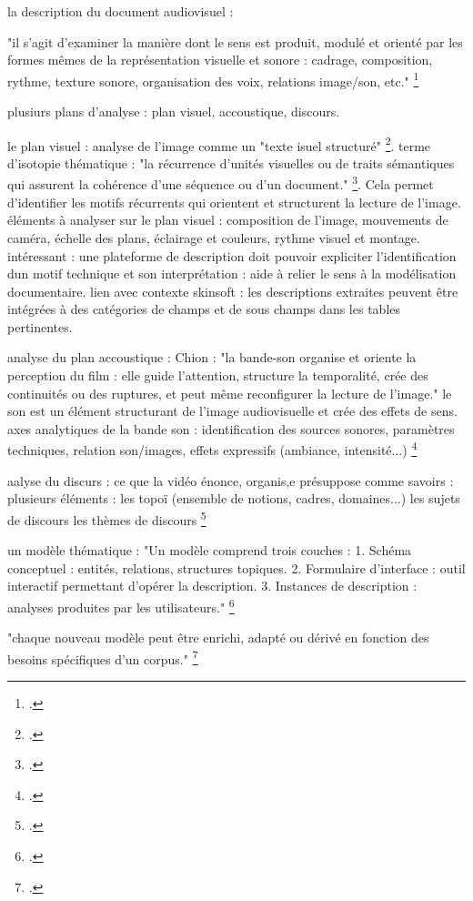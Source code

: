 la description du document audiovisuel : 

"il s’agit d’examiner la manière dont
le sens est produit, modulé et orienté par les formes mêmes de la
représentation visuelle et sonore : cadrage, composition, rythme, texture sonore, organisation des voix, relations image/son, etc." \footcite{stockinger2011}

plusiurs plans d'analyse : plan visuel, accoustique, discours. 

le plan visuel : 
analyse de l'image comme un "texte isuel structuré" \footcite{stockinger2011}. 
terme d'isotopie thématique : "la récurrence d’unités visuelles ou de traits sémantiques qui assurent la cohérence d’une séquence ou d’un document." \footcite{stockinger2011}. Cela permet d'identifier les motifs récurrents qui orientent et structurent la lecture de l'image.  
éléments à analyser sur le plan visuel : composition de l'image, mouvements de caméra, échelle des plans, éclairage et couleurs, rythme visuel et montage. 
intéressant : une plateforme de description doit pouvoir expliciter l'identification dun motif technique et son interprétation : aide à relier le sens à la modélisation documentaire. 
lien avec contexte skinsoft : les descriptions extraites peuvent être intégrées à des catégories de champs et de sous champs dans les tables pertinentes. 

analyse du plan accoustique : 
Chion : "la bande-son organise et oriente
la perception du film : elle guide l’attention, structure la temporalité, crée des continuités ou des ruptures, et peut même reconfigurer la lecture de l’image."
le son est un élément structurant de l'image audiovisuelle et crée des effets de sens. 
axes analytiques de la bande son : identification des sources sonores, paramètres techniques, relation son/images, effets expressifs (ambiance, intensité...) \footcite{stockinger2011}

aalyse du discurs : ce que la vidéo énonce, organis,e présuppose comme savoirs : plusieurs éléments : 
les topoï (ensemble de notions, cadres, domaines...)
les sujets de discours 
les thèmes de discours 
\footcite{stockinger2011}

un modèle thématique :
"Un modèle comprend trois couches :
1. Schéma conceptuel : entités, relations, structures topiques.
2. Formulaire d’interface : outil interactif permettant d’opérer la
description.
3. Instances de description : analyses produites par les utilisateurs." \footcite{stockinger2011}

"chaque nouveau modèle peut être
enrichi, adapté ou dérivé en fonction des besoins spécifiques d’un corpus." \footcite{stockinger2011}

